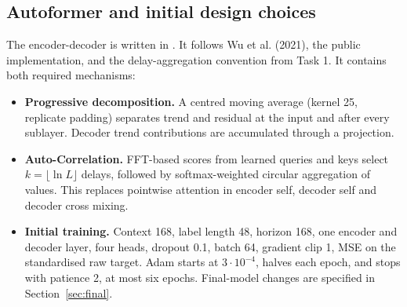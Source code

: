 \subsection{Autoformer and initial design choices}
The encoder-decoder is written in .
It follows Wu et al. (2021), the public  implementation, and the delay-aggregation
convention from Task 1. It contains both required mechanisms:
\begin{itemize}
  \item \textbf{Progressive decomposition.} A centred moving average (kernel 25,
        replicate padding) separates trend and residual at the input and after every
        sublayer. Decoder trend contributions are accumulated through a projection.
  \item \textbf{Auto-Correlation.} FFT-based scores from learned queries and keys
        select $k=\lfloor\ln L\rfloor$ delays, followed by softmax-weighted circular
        aggregation of values. This replaces pointwise attention in encoder self,
        decoder self and decoder cross mixing.
  \item \textbf{Initial training.} Context 168, label length 48, horizon 168, one
        encoder and decoder layer, four heads, dropout 0.1, batch 64, gradient clip 1,
        MSE on the standardised raw target. Adam starts at $3\cdot10^{-4}$, halves
        each epoch, and stops with patience 2, at most six epochs. Final-model changes
        are specified in Section~\ref{sec:final}.
\end{itemize}

